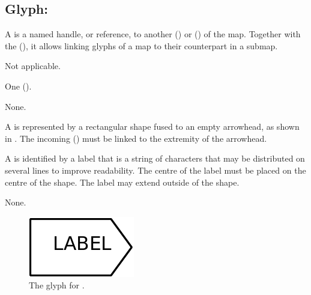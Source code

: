 \subsection{Glyph: }
\label{sec:tag}

A  is a named handle, or reference, to another  () or  () of the map.
Together with the  (), it allows linking glyphs of a map to their counterpart in a submap.

\begin{glyphDescription}

\glyphSboTerm Not applicable.

\glyphIncoming
One  ().

\glyphOutgoing
None.

\glyphContainer A  is represented by a rectangular shape fused to an empty arrowhead, as shown in .
The incoming  () must be linked to the extremity of the arrowhead.

\glyphLabel A  is identified by a label that is  a string of characters that may be distributed on several lines to improve readability.
The centre of the label must be placed on the centre of the shape.
The label may extend outside of the shape.

\glyphAux 
None.

\end{glyphDescription}

\begin{figure}[H]
  \centering
  \includegraphics{images/build/tag.pdf}
  \caption{The \PD glyph for .}
  \label{fig:tag}
\end{figure}
